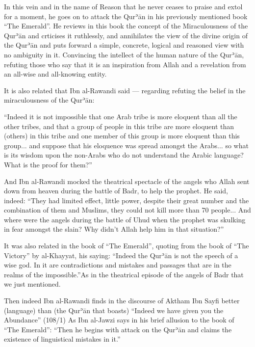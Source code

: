\documentclass[12pt]{book}
\def \Quran{Qurʾān} %
\def \Qrn{\Quran}   %
\begin{document}
In this vein and in the name of Reason that he never ceases to praise and extol
for a moment, he goes on to attack the \Qrn{} in his previously mentioned book
“The Emerald”. He reviews in this book the concept of the Miraculousness of the
\Qrn{} and crticises it ruthlessly, and annihilates the view of the divine
origin of the \Qrn{} and puts forward a simple, concrete, logical and reasoned
view with no ambiguity in it. Convincing the intellect of the human nature of
the \Quran, refuting those who say that it is an inspiration from Allah and a
revelation from an all-wise and all-knowing entity.

It is also related that Ibn al-Rawandi said — regarding refuting the belief in
the miraculousness of the \Quran:

“Indeed it is not impossible that one Arab tribe is more eloquent than all the
other tribes, and that a group of people in this tribe are more eloquent than
(others) in this tribe and one member of this group is more eloquent than this
group... and suppose that his eloquence was spread amongst the Arabs... so what
is its wisdom upon the non-Arabs who do not understand the Arabic language?
What is the proof for them?”\footnotemark


And Ibn al-Rawandi mocked the theatrical spectacle of the angels who Allah sent
down from heaven during the battle of Badr, to help the prophet. He said,
indeed: “They had limited effect, little power, despite their great number and
the combination of them and Muslims, they could not kill more than 70 people...
And where were the angels during the battle of Uhud when the prophet was
skulking in fear amongst the slain? Why didn’t Allah help him in that
situation?”\footnotemark


It was also related in the book of “The Emerald”, quoting from the book of
“The Victory” by al-Khayyat, his saying: “Indeed the \Qrn{} is not the speech
of a wise god. In it are contradictions and mistakes and passages that are in
the realms of the impossible.”\footnotemark As in the theatrical episode of
the angels of Badr that we just mentioned.


Then indeed Ibn al-Rawandi finds in the discourse of Aktham Ibn Sayfi better
(language) than (the \Qrn{} that boasts) “Indeed we have given you the
Abundance” (108/1)\footnotemark
{}
As Ibn al-Jawzi says in his brief allusion to the book of “The Emerald”: “Then
he begins with attack on the \Qrn{} and claims the existence of linguistical
mistakes in it.”\footnotemark
\end{document}
